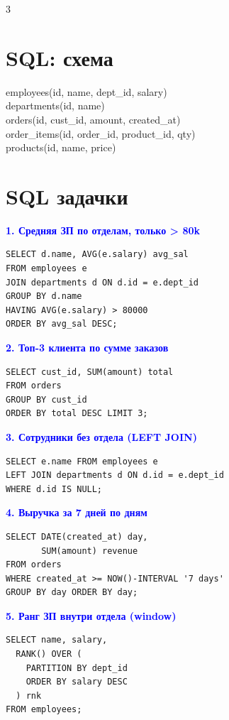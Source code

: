 \documentclass[8.5pt,a4paper]{article}
\newcommand{\hl}[2]{\textbf{\textcolor{#1}{#2}}}
\begin{document}
\begin{multicols}{3}
\section{SQL: схема}

{\fontsize{6.5}{8}\ttfamily\color{codefg}
employees(id, name, dept\_id, salary)\\
departments(id, name)\\
orders(id, cust\_id, amount, created\_at)\\
order\_items(id, order\_id, product\_id, qty)\\
products(id, name, price)
}

\section{SQL задачки}

\hl{blue}{1. Средняя ЗП по отделам, только > 80k}
\begin{lstlisting}[style=sqlcode]
SELECT d.name, AVG(e.salary) avg_sal
FROM employees e
JOIN departments d ON d.id = e.dept_id
GROUP BY d.name
HAVING AVG(e.salary) > 80000
ORDER BY avg_sal DESC;
\end{lstlisting}

\hl{blue}{2. Топ-3 клиента по сумме заказов}
\begin{lstlisting}[style=sqlcode]
SELECT cust_id, SUM(amount) total
FROM orders
GROUP BY cust_id
ORDER BY total DESC LIMIT 3;
\end{lstlisting}

\hl{blue}{3. Сотрудники без отдела (LEFT JOIN)}
\begin{lstlisting}[style=sqlcode]
SELECT e.name FROM employees e
LEFT JOIN departments d ON d.id = e.dept_id
WHERE d.id IS NULL;
\end{lstlisting}

\hl{blue}{4. Выручка за 7 дней по дням}
\begin{lstlisting}[style=sqlcode]
SELECT DATE(created_at) day,
       SUM(amount) revenue
FROM orders
WHERE created_at >= NOW()-INTERVAL '7 days'
GROUP BY day ORDER BY day;
\end{lstlisting}

\hl{blue}{5. Ранг ЗП внутри отдела (window)}
\begin{lstlisting}[style=sqlcode]
SELECT name, salary,
  RANK() OVER (
    PARTITION BY dept_id
    ORDER BY salary DESC
  ) rnk
FROM employees;
\end{lstlisting}


\end{multicols}
\end{document}
